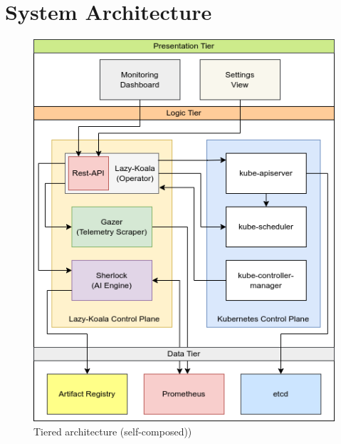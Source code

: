 \section{System Architecture}


\begin{figure}[H]
    \includegraphics[width=14cm]{assets/system-design/tier-architecture.png}
    \caption{Tiered architecture (self-composed))}
    \label{fig:tier-architecture}
\end{figure}

